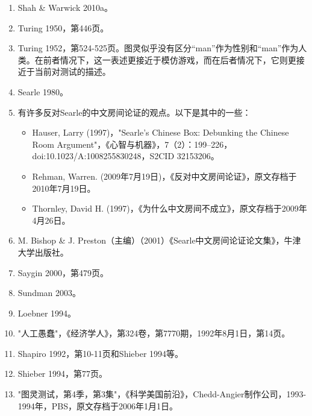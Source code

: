 \begin{enumerate}
\item Shah & Warwick 2010a。
\item Turing 1950，第446页。
\item Turing 1952，第524-525页。图灵似乎没有区分“man”作为性别和“man”作为人类。在前者情况下，这一表述更接近于模仿游戏，而在后者情况下，它则更接近于当前对测试的描述。
\item Searle 1980。
\item 有许多反对Searle的中文房间论证的观点。以下是其中的一些：
\begin{itemize}
\item Hauser, Larry (1997)，"Searle's Chinese Box: Debunking the Chinese Room Argument"，《心智与机器》，7（2）：199–226，doi:10.1023/A:1008255830248，S2CID 32153206。
\item Rehman, Warren. (2009年7月19日)，《反对中文房间论证》，原文存档于2010年7月19日。
\item Thornley, David H. (1997)，《为什么中文房间不成立》，原文存档于2009年4月26日。
\end{itemize}
\item M. Bishop & J. Preston（主编）（2001）《Searle中文房间论证论文集》，牛津大学出版社。
\item Saygin 2000，第479页。
\item Sundman 2003。
\item Loebner 1994。
\item "人工愚蠢"，《经济学人》，第324卷，第7770期，1992年8月1日，第14页。
\item Shapiro 1992，第10-11页和Shieber 1994等。
\item Shieber 1994，第77页。
\item "图灵测试，第4季，第3集"，《科学美国前沿》，Chedd-Angier制作公司，1993-1994年，PBS，原文存档于2006年1月1日。
\end{enumerate}